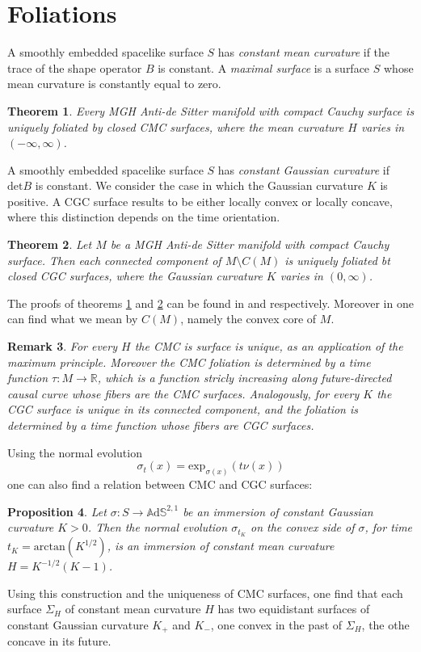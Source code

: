\documentclass[10pt,a4paper,oneside,reqno]{book}
\def\R{\mathbb{R}}
\def\A{\mathbb{A}\mathrm{d}\mathbb{S}}
\theoremstyle{plain}
\newtheorem{theorem}{Theorem}[chapter] %
\theoremstyle{definition}
\theoremstyle{plain}
\newtheorem{proposition}[theorem]{Proposition}
\theoremstyle{plain}
\newtheorem{observation}[theorem]{Remark}
\theoremstyle{mystyleNormalFont}
\begin{document}
\section{Foliations}
A smoothly embedded spacelike surface $S$ has \textit{constant mean curvature} if the trace of the shape operator $B$ is constant. A \textit{maximal surface} is a surface $S$ whose mean curvature is constantly equal to zero.\\
\begin{theorem}\label{thm:CMC_foliation}
    Every MGH Anti-de Sitter manifold with compact Cauchy surface is uniquely foliated by closed CMC surfaces, where the mean curvature $H$ varies in $(-\infty,\infty)$.
\end{theorem}
A smoothly embedded spacelike surface $S$ has \textit{constant Gaussian curvature} if $\text{det}B$ is constant. We consider the case in which the Gaussian curvature $K$ is positive. A CGC surface results to be either locally convex or locally concave, where this distinction depends on the time orientation. 
\begin{theorem}\label{thm:CGC_foliation}
    Let $M$ be a MGH Anti-de Sitter manifold with compact Cauchy surface. Then each connected component of $M \setminus C(M)$ is uniquely foliated bt closed CGC surfaces, where the Gaussian curvature $K$ varies in $(0,\infty)$.
\end{theorem}
The proofs of theorems \ref{thm:CMC_foliation} and \ref{thm:CGC_foliation} can be found in \cite{barbot2004constant} and \cite{barbot2008prescribing} respectively. Moreover in \cite{barbot2008prescribing} one can find what we mean by $C(M)$, namely the convex core of $M$.
\begin{observation}
    For every $H$ the CMC is surface is unique, as an application of the maximum principle. Moreover the CMC foliation is determined by a time function $\tau:M\to\R$, which is a function stricly increasing along future-directed causal curve whose fibers are the CMC surfaces. Analogously, for every $K$ the CGC surface is unique in its connected component, and the foliation is determined by a time function whose fibers are CGC surfaces.
\end{observation}
Using the normal evolution
\[
    \sigma_t(x) = \text{exp}_{\sigma(x)} (t\nu(x))
\]
one can also find a relation between CMC and CGC surfaces:
\begin{proposition}
    Let $\sigma: S \to\A^{2,1}$ be an immersion of constant Gaussian curvature $K>0$. Then the normal evolution $\sigma_{t_K}$ on the convex side of $\sigma$, for time $t_K=\text{arctan}(K^{1/2})$, is an immersion of constant mean curvature $H=K^{-1/2}(K-1)$.
\end{proposition}
Using this construction and the uniqueness of CMC surfaces, one find that each surface $\Sigma_H$ of constant mean curvature $H$ has two equidistant surfaces of constant Gaussian curvature $K_+$ and $K_-$, one convex in the past of $\Sigma_H$, the othe concave in its future.
\end{document}
